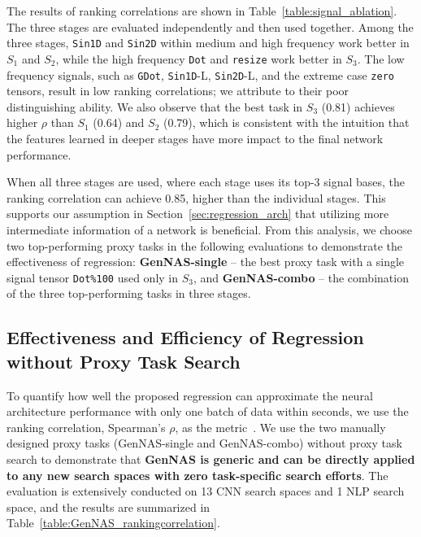 \documentclass{article}
\begin{document}
The results of ranking correlations are shown in Table~\ref{table:signal_ablation}.
The three stages are evaluated independently and then used together.
Among the three stages,
\texttt{Sin1D} and \texttt{Sin2D} within medium and high frequency work better in $S_1$ and $S_2$, while the high frequency \texttt{Dot} and \texttt{resize} work better in $S_3$. 
The low frequency signals, such as \texttt{GDot}, \texttt{Sin1D}-L, \texttt{Sin2D}-L, and the extreme case \texttt{zero} tensors, result in low ranking correlations; we attribute to their poor distinguishing ability. 
We also observe that the best task in $S_3$ (0.81) achieves higher $\rho$ than $S_1$ (0.64) and $S_2$ (0.79), which is consistent with the intuition that the features learned in deeper stages have more impact to the final network performance. 

When all three stages are used, where each stage uses its top-3 signal bases,
the ranking correlation can achieve 0.85, higher than the individual stages. This supports our assumption in Section~\ref{sec:regression_arch} that utilizing more intermediate information of a network is beneficial. 
From this analysis, we choose two top-performing proxy tasks in the following evaluations to demonstrate the effectiveness of regression:
\textbf{GenNAS-single} -- the best proxy task with a single signal tensor \texttt{Dot\%100} used only in $S_3$,
and \textbf{GenNAS-combo} -- the combination of the three top-performing tasks in three stages.
















\vspace{-10pt}
\subsection{Effectiveness and Efficiency of Regression without Proxy Task Search}
\label{sec:exp-regression}
\vspace{-4pt}




To quantify how well the proposed regression can approximate the neural architecture performance with only one batch of data within seconds, we use the ranking correlation, Spearman's $\rho$, as the metric~\cite{abdelfattah2021zero, liu2020labels, zela2019understanding}.
We use the two manually designed proxy tasks (GenNAS-single and GenNAS-combo) without proxy task search to demonstrate that \textbf{GenNAS is generic and can be directly applied to any new search spaces with zero task-specific search efforts}.
The evaluation is extensively conducted on 13 CNN search spaces and 1 NLP search space, and the results are summarized in Table~\ref{table:GenNAS_rankingcorrelation}.
\end{document}
